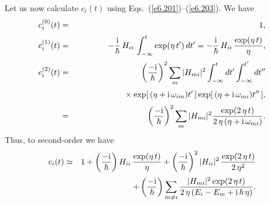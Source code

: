 Let us now calculate $c_i(t)$ using Eqs.~(\ref{e6.201})--(\ref{e6.203}). We have
\begin{eqnarray}
c_i^{(0)} (t) &=& 1,\\[0.5ex]
c_i^{(1)} (t) &=& -\frac{\rm i}{\hbar}\,H_{ii}\, \int_{-\infty}^t 
\exp(\eta \,t')\,dt'= -\frac{\rm i}{\hbar}\,H_{ii} \,\frac{\exp(
\eta\, t)}{\eta},\\[0.5ex]
c_i^{(2)} (t) &=& \left(\frac{-{\rm i}}{\hbar} \right)^2
\sum_m |H_{mi}|^2 \int_{-\infty}^t dt' \int_{-\infty}^{t'} dt''\nonumber\\[0.5ex]&& \mbox{\hspace{2cm}}\times
\exp[\,(\eta+ {\rm i}\,\omega_{im}) t'\,] \exp[
\,(\eta+ {\rm i}\,\omega_{mi}) t''\,],\nonumber\\[0.5ex]
&=& \left(\frac{-{\rm i}}{\hbar} \right)^2 \sum_m |H_{mi}|^2 
\frac{\exp(2 \,\eta\, t)}{2\,\eta\,(\eta + {\rm i}\,\omega_{mi})}.
\end{eqnarray}
Thus, to second-order we have
\begin{eqnarray}
c_i(t) &\simeq &1 + \left(\frac{-{\rm i}}{\hbar}\right) H_{ii}\, \frac{\exp(\eta \,t)}{\eta}
+ \left(\frac{-{\rm i}}{\hbar} \right)^2  |H_{ii}|^2 \,\frac{\exp(2\,\eta\, t)}
{2\, \eta^2} \nonumber\\[0.5ex]
&&+\left(\frac{-{\rm i}}{\hbar}\right) \sum_{m\neq i}
\frac{|H_{mi}|^2 \exp(2\,\eta\, t)}
{2\,\eta\,(E_i -E_m  + {\rm i}\,\hbar \,\eta)}.\label{e6.287}
\end{eqnarray}

